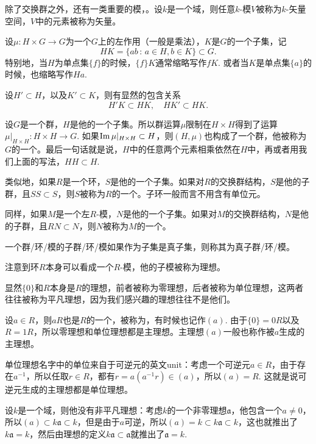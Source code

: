 \para 除了交换群之外，还有一类重要的模，。设$k$是一个域，则任意$k$-模$V$被称为$k$-矢量空间，$V$中的元素被称为矢量。

\para 设$\mu:H\times G\to G$为一个$G$上的左作用（一般是乘法），$K$是$G$的一个子集，记
\[
	HK=\{ab\,:\,a\in H,b\in K\}\subset G.
\]
特别地，当$H$为单点集$\{f\}$的时候，$\{f\}K$通常缩略写作$fK$. 或者当$K$是单点集$\{a\}$的时候，也缩略写作$Ha$.

设$H'\subset H$，以及$K'\subset K$，则有显然的包含关系
\[
	H'K\subset HK,\quad HK'\subset HK.
\]


\para 设$G$是一个群，$H$是他的一个子集。所以群运算$\mu$限制在$H\times H$得到了运算$\mu|_{H\times H}:H\times H\to G$. 如果$\operatorname{Im}\mu|_{H\times H}\subset H$，则$(H,\mu)$也构成了一个群，他被称为$G$的一个。最后一句话就是说，$H$中的任意两个元素相乘依然在$H$中，再或者用我们上面的写法，$HH\subset H$.

类似地，如果$R$是一个环，$S$是他的一个子集。如果对$R$的交换群结构，$S$是他的子群，且$SS\subset S$，则$S$被称为$R$的一个。子环一般而言不用含有单位元。

同样，如果$M$是一个左$R$-模，$N$是他的一个子集。如果对$M$的交换群结构，$N$是他的子群，且$RN\subset N$，则$N$被称为$M$的一个。

一个群/环/模的子群/环/模如果作为子集是真子集，则称其为真子群/环/模。

\para 注意到环$R$本身可以看成一个$R$-模，他的子模被称为理想。

显然$\{0\}$和$R$本身是$R$的理想，前者被称为零理想，后者被称为单位理想，这两者往往被称为平凡理想，因为我们感兴趣的理想往往不是他们。

设$a\in R$，则$aR$也是$R$的一个，被称为，有时候也记作$(a)$. 由于$\{0\}=0R$以及$R=1R$，所以零理想和单位理想都是主理想。主理想$(a)$一般也称作被$a$生成的主理想。

单位理想名字中的单位来自于可逆元的英文unit：考虑一个可逆元$a\in R$，由于存在$a^{-1}$，所以任取$r\in R$，都有$r=a(a^{-1}r)\in (a)$，所以$(a)=R$. 这就是说可逆元生成的主理想都是单位理想。

设$k$是一个域，则他没有非平凡理想：考虑$k$的一个非零理想$\mathfrak{a}$，他包含一个$a\neq 0$，所以$(a)\subset k\mathfrak{a} \subset k$，但是由于$a$可逆，所以$(a)=k\subset k\mathfrak{a} \subset k$，这也就推出了$k\mathfrak{a}=k$，然后由理想的定义$k\mathfrak{a}\subset \mathfrak{a}$就推出了$\mathfrak{a}=k$.

